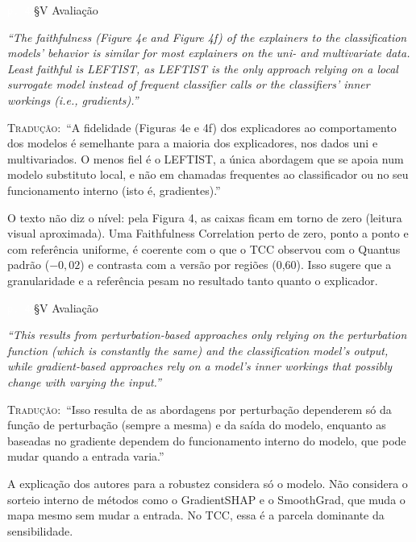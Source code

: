 \documentclass[11pt,a4paper]{article}
\newcommand{\pagechip}[1]{{\setlength{\fboxsep}{1.5pt}\colorbox{cAcc}{\textcolor{white}{\scriptsize\texttt{#1}}}}}
\newenvironment{origquote}{\par\itshape\small}{\par}
\newenvironment{tradquote}{\par\small\textsc{Tradução:}\ }{\par}
\newcommand{\explab}[1]{\par\smallskip{\small\color{cAcc}\textbf{\MakeUppercase{#1}}}\par}
\begin{document}
\begin{citacard}{\pagechip{p. 4} §V Avaliação}
\begin{origquote}“The faithfulness (Figure 4e and Figure 4f) of the explainers to the classification models’ behavior is similar for most explainers on the uni- and multivariate data. Least faithful is LEFTIST, as LEFTIST is the only approach relying on a local surrogate model instead of frequent classifier calls or the classifiers’ inner workings (i.e., gradients).”\end{origquote}
\begin{tradquote}“A fidelidade (Figuras 4e e 4f) dos explicadores ao comportamento dos modelos é semelhante para a maioria dos explicadores, nos dados uni e multivariados. O menos fiel é o LEFTIST, a única abordagem que se apoia num modelo substituto local, e não em chamadas frequentes ao classificador ou no seu funcionamento interno (isto é, gradientes).”\end{tradquote}
\explab{Explicação}
O texto não diz o nível: pela Figura 4, as caixas ficam em torno de zero (leitura visual aproximada). Uma Faithfulness Correlation perto de zero, ponto a ponto e com referência uniforme, é coerente com o que o TCC observou com o Quantus padrão ($-0{,}02$) e contrasta com a versão por regiões (0,60). Isso sugere que a granularidade e a referência pesam no resultado tanto quanto o explicador.
\end{citacard}

\begin{citacard}{\pagechip{p. 4} §V Avaliação}
\begin{origquote}“This results from perturbation-based approaches only relying on the perturbation function (which is constantly the same) and the classification model’s output, while gradient-based approaches rely on a model’s inner workings that possibly change with varying the input.”\end{origquote}
\begin{tradquote}“Isso resulta de as abordagens por perturbação dependerem só da função de perturbação (sempre a mesma) e da saída do modelo, enquanto as baseadas no gradiente dependem do funcionamento interno do modelo, que pode mudar quando a entrada varia.”\end{tradquote}
\explab{Explicação}
A explicação dos autores para a robustez considera só o modelo. Não considera o sorteio interno de métodos como o GradientSHAP e o SmoothGrad, que muda o mapa mesmo sem mudar a entrada. No TCC, essa é a parcela dominante da sensibilidade.
\end{citacard}
\end{document}
